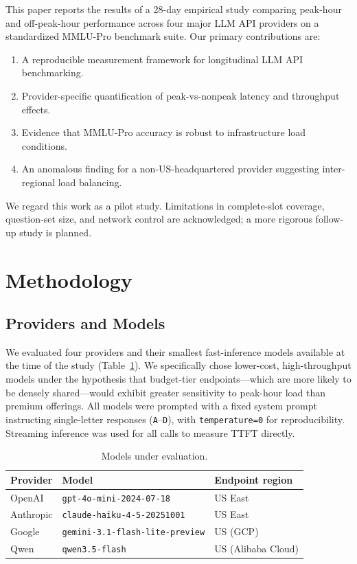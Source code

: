\documentclass[11pt]{article}
\begin{document}
This paper reports the results of a 28-day empirical study comparing peak-hour and
off-peak-hour performance across four major LLM API providers on a standardized MMLU-Pro
benchmark suite.
Our primary contributions are:
\begin{enumerate}
    \item A reproducible measurement framework for longitudinal LLM API benchmarking.
    \item Provider-specific quantification of peak-vs-nonpeak latency and throughput effects.
    \item Evidence that MMLU-Pro accuracy is robust to infrastructure load conditions.
    \item An anomalous finding for a non-US-headquartered provider suggesting
          inter-regional load balancing.
\end{enumerate}
We regard this work as a pilot study. Limitations in complete-slot coverage, question-set size,
and network control are acknowledged; a more rigorous follow-up study is planned.

\section{Methodology}

\subsection{Providers and Models}

We evaluated four providers and their smallest fast-inference models available at the time
of the study (Table~\ref{tab:models}).
We specifically chose lower-cost, high-throughput models under the hypothesis that
budget-tier endpoints---which are more likely to be densely shared---would exhibit greater
sensitivity to peak-hour load than premium offerings.
All models were prompted with a fixed system prompt instructing single-letter responses
(\texttt{A}--\texttt{D}), with \texttt{temperature=0} for reproducibility.
Streaming inference was used for all calls to measure TTFT directly.

\begin{table}[h]
\centering
\caption{Models under evaluation.}
\label{tab:models}
\begin{tabular}{lll}
\toprule
\textbf{Provider} & \textbf{Model} & \textbf{Endpoint region} \\
\midrule
OpenAI    & \texttt{gpt-4o-mini-2024-07-18}        & US East \\
Anthropic & \texttt{claude-haiku-4-5-20251001}     & US East \\
Google    & \texttt{gemini-3.1-flash-lite-preview}  & US (GCP) \\
Qwen      & \texttt{qwen3.5-flash}                  & US (Alibaba Cloud) \\
\bottomrule
\end{tabular}
\end{table}
\end{document}
